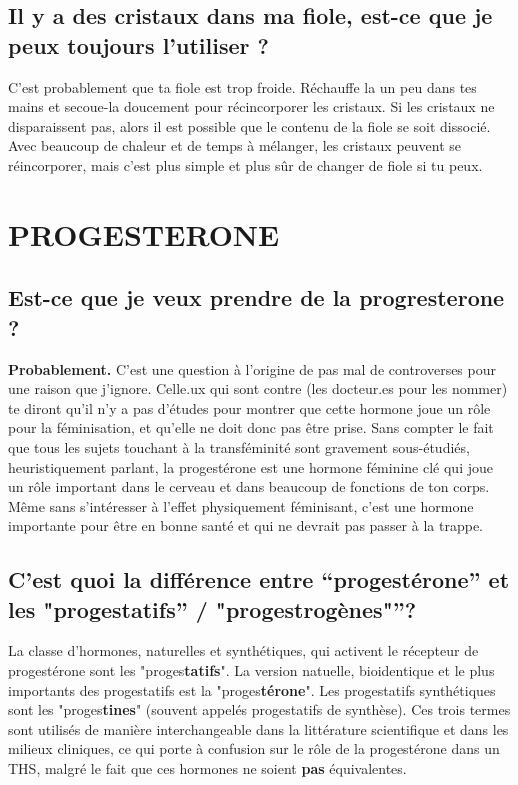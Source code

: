 \documentclass{article}
\begin{document}
\subsection{Il y a des cristaux dans ma fiole, est-ce que je peux toujours l'utiliser ?}

C'est probablement que ta fiole est trop froide. Réchauffe la un peu dans tes mains et secoue-la doucement pour récincorporer les cristaux. Si les cristaux ne disparaissent pas, alors il est possible que le contenu de la fiole se soit dissocié. Avec beaucoup de chaleur et de temps à mélanger, les cristaux peuvent se réincorporer, mais c'est plus simple et plus sûr de changer de fiole si tu peux.
 

\section{PROGESTERONE}

\subsection{Est-ce que je veux prendre de la progresterone ?}

\textbf{Probablement.} C'est une question à l'origine de pas mal de controverses pour une raison que j'ignore. Celle.ux qui sont contre (les docteur.es pour les nommer) te diront qu'il n'y a pas d'études pour montrer que cette hormone joue un rôle pour la féminisation, et qu'elle ne doit donc pas être prise. Sans compter le fait que tous les sujets touchant à la transféminité sont gravement sous-étudiés, heuristiquement parlant, la progestérone est une hormone féminine clé qui joue un rôle important dans le cerveau et dans beaucoup de fonctions de ton corps. Même sans s'intéresser à l'effet physiquement féminisant, c'est une hormone importante pour être en bonne santé et qui ne devrait pas passer à la trappe. 

\subsection{C'est quoi la différence entre “progestérone” et les "progestatifs” / "progestrogènes"”?}

La classe d'hormones, naturelles et synthétiques, qui activent le récepteur de progestérone sont les "proges\textbf{tatifs}". La version natuelle, bioidentique et le plus importants des progestatifs est la "proges\textbf{térone}". Les progestatifs synthétiques sont les "proges\textbf{tines}" (souvent appelés progestatifs de synthèse). Ces trois termes sont utilisés de manière interchangeable dans la littérature scientifique et dans les milieux cliniques, ce qui porte à confusion sur le rôle de la progestérone dans un THS, malgré le fait que ces hormones ne soient \textbf{pas} équivalentes.
\end{document}
